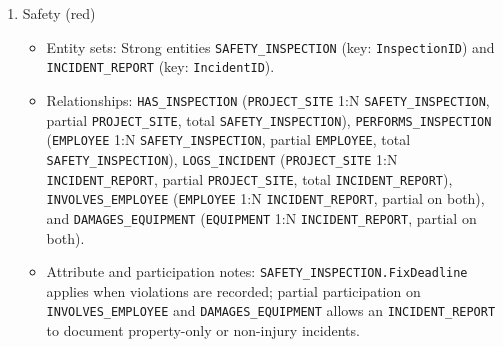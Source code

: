 \documentclass[a4paper,12pt]{report}
\providecommand{\tightlist}{%
  \setlength{\itemsep}{0pt}\setlength{\parskip}{0pt}}
\begin{document}
\begin{enumerate}
  \begin{itemize}
  \tightlist
  \item
    Entity sets: Strong entity \texttt{SUBCONTRACTOR} (\allowbreak{}key: \texttt{SubcontractorID}), connected across domains to \texttt{PROJECT}.
  \item
    Relationships: \texttt{ENGAGES\_\allowbreak{}SUBCONTRACTOR} (\allowbreak{}M:N between \texttt{PROJECT} and \texttt{SUBCONTRACTOR}, partial on both, carrying \texttt{ContractAgreementNo}, \texttt{ScopeOfWork}, \texttt{ContractValue}, \texttt{WarrantyHoldRate}, \texttt{StartDate}, and \texttt{EndDate}).
  \item
    Attribute classifications: \texttt{SUBCONTRACTOR.\allowbreak{}TaxCode} and \texttt{SUBCONTRACTOR.\allowbreak{}LicenseNumber} are candidate keys; \texttt{ContractAgreementNo} uniquely identifies each engagement contract across projects.
  \end{itemize}
\item
  Safety (\allowbreak{}red)

  \begin{itemize}
  \tightlist
  \item
    Entity sets: Strong entities \texttt{SAFETY\_\allowbreak{}INSPECTION} (\allowbreak{}key: \texttt{InspectionID}) and \texttt{INCIDENT\_\allowbreak{}REPORT} (\allowbreak{}key: \texttt{IncidentID}).
  \item
    Relationships: \texttt{HAS\_\allowbreak{}INSPECTION} (\allowbreak{}\texttt{PROJECT\_\allowbreak{}SITE} 1:N \texttt{SAFETY\_\allowbreak{}INSPECTION}, partial \texttt{PROJECT\_\allowbreak{}SITE}, total \texttt{SAFETY\_\allowbreak{}INSPECTION}), \texttt{PERFORMS\_\allowbreak{}INSPECTION} (\allowbreak{}\texttt{EMPLOYEE} 1:N \texttt{SAFETY\_\allowbreak{}INSPECTION}, partial \texttt{EMPLOYEE}, total \texttt{SAFETY\_\allowbreak{}INSPECTION}), \texttt{LOGS\_\allowbreak{}INCIDENT} (\allowbreak{}\texttt{PROJECT\_\allowbreak{}SITE} 1:N \texttt{INCIDENT\_\allowbreak{}REPORT}, partial \texttt{PROJECT\_\allowbreak{}SITE}, total \texttt{INCIDENT\_\allowbreak{}REPORT}), \texttt{INVOLVES\_\allowbreak{}EMPLOYEE} (\allowbreak{}\texttt{EMPLOYEE} 1:N \texttt{INCIDENT\_\allowbreak{}REPORT}, partial on both), and \texttt{DAMAGES\_\allowbreak{}EQUIPMENT} (\allowbreak{}\texttt{EQUIPMENT} 1:N \texttt{INCIDENT\_\allowbreak{}REPORT}, partial on both).
  \item
    Attribute and participation notes: \texttt{SAFETY\_\allowbreak{}INSPECTION.\allowbreak{}FixDeadline} applies when violations are recorded; partial participation on \texttt{INVOLVES\_\allowbreak{}EMPLOYEE} and \texttt{DAMAGES\_\allowbreak{}EQUIPMENT} allows an \texttt{INCIDENT\_\allowbreak{}REPORT} to document property-only or non-injury incidents.
  \end{itemize}
\end{enumerate}
\end{document}
